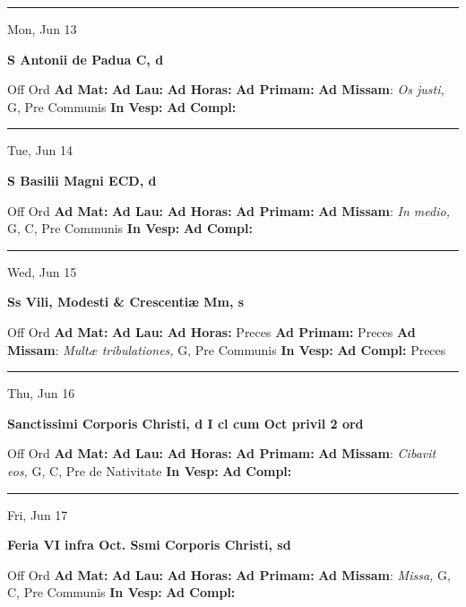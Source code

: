 \documentclass[letterpaper, 10pt]{article}
\begin{document}
\hrule
\begin{center}
Mon, Jun 13
\end{center}\textbf{ \large S Antonii de Padua C, \textnormal{\normalsize d}}
\begin{justify}
Off Ord
\textbf{Ad Mat: }
\textbf{Ad Lau: }
\textbf{Ad Horas: }
\textbf{Ad Primam: }
\textbf{Ad Missam}: \textit{Os justi,} G, Pre Communis
\textbf{In Vesp: }
\textbf{Ad Compl: }\end{justify}



\hrule
\begin{center}
Tue, Jun 14
\end{center}\textbf{ \large S Basilii Magni ECD, \textnormal{\normalsize d}}
\begin{justify}
Off Ord
\textbf{Ad Mat: }
\textbf{Ad Lau: }
\textbf{Ad Horas: }
\textbf{Ad Primam: }
\textbf{Ad Missam}: \textit{In medio,} G, C, Pre Communis
\textbf{In Vesp: }
\textbf{Ad Compl: }\end{justify}



\hrule
\begin{center}
Wed, Jun 15
\end{center}\textbf{ \large Ss Vili, Modesti \& Crescentiæ Mm, \textnormal{\normalsize s}}
\begin{justify}
Off Ord
\textbf{Ad Mat: }
\textbf{Ad Lau: }
\textbf{Ad Horas: }Preces
\textbf{Ad Primam: }Preces
\textbf{Ad Missam}: \textit{Multæ tribulationes,} G, Pre Communis
\textbf{In Vesp: }
\textbf{Ad Compl: }Preces\end{justify}



\hrule
\begin{center}
Thu, Jun 16
\end{center}\textbf{ \large Sanctissimi Corporis Christi, \textnormal{\normalsize d I cl cum Oct privil 2 ord}}
\begin{justify}
Off Ord
\textbf{Ad Mat: }
\textbf{Ad Lau: }
\textbf{Ad Horas: }
\textbf{Ad Primam: }
\textbf{Ad Missam}: \textit{Cibavit eos,} G, C, Pre de Nativitate
\textbf{In Vesp: }
\textbf{Ad Compl: }\end{justify}



\hrule
\begin{center}
Fri, Jun 17
\end{center}\textbf{ \large Feria VI infra Oct. Ssmi Corporis Christi, \textnormal{\normalsize sd}}
\begin{justify}
Off Ord
\textbf{Ad Mat: }
\textbf{Ad Lau: }
\textbf{Ad Horas: }
\textbf{Ad Primam: }
\textbf{Ad Missam}: \textit{Missa,} G, C, Pre Communis
\textbf{In Vesp: }
\textbf{Ad Compl: }\end{justify}
\end{document}
